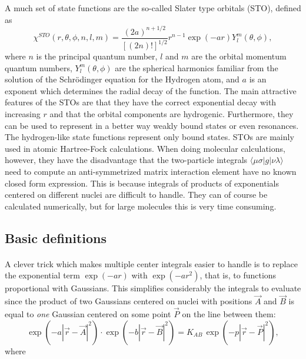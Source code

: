 \documentclass[%
twoside,                 %
final,                   %
10pt]{article}
\begin{document}
A much set of state functions are the so-called 
Slater type orbitals (STO), defined as
\begin{equation}
 \chi^{STO}(r,\theta,\phi,n,l,m) = \frac{(2a)^{n+1/2}}{[(2n)!]^{1/2}}r^{n-1}\exp(-a r) Y^m_l(\theta,\phi),
\end{equation}
where $n$ is the principal quantum number, $l$ and $m$ are the orbital momentum quantum numbers,
$Y^m_l(\theta,\phi)$ are the spherical harmonics familiar from the solution of the Schr\"odinger
equation for the Hydrogen atom, and $a$ is an exponent which determines the radial decay of the
function. The main attractive features of the STOs are that they have the correct exponential decay with
increasing $r$ and that the orbital components are hydrogenic. 
Furthermore, they can be used to represent in a better way weakly bound states or even resonances. The hydrogen-like state functions 
represent only bound states.
STOs are mainly 
used in atomic Hartree-Fock calculations. When doing molecular calculations, however, they have the
disadvantage that the two-particle integrals $\langle\mu\sigma\vert g\vert\nu\lambda\rangle$ need to compute 
an anti-symmetrized matrix interaction element have no known closed form expression. This is because integrals of products
of exponentials centered on different nuclei are difficult to handle. They can of course be calculated
numerically, but for large molecules this is very time consuming.



\subsection{Basic definitions}

\paragraph{}

A clever trick which makes multiple center integrals easier to handle is to replace the exponential
term $\exp(-a r)$ with $\exp(-a r^2)$, that is, to functions proportional with Gaussians. This simplifies 
considerably the integrals to evaluate since the product of two Gaussians centered on nuclei with positions
$\vec A$ and $\vec B$ is equal to \emph{one} Gaussian centered on some point $\vec P$ on
the line between them:
\begin{equation}
\label{eq:gaussian_product}
 \exp(-a|\vec r - \vec A|^2)\cdot \exp(-b|\vec r - \vec B|^2) = K_{AB}\,\exp(-p|\vec r - \vec P|^2),
\end{equation}
where
\end{document}
